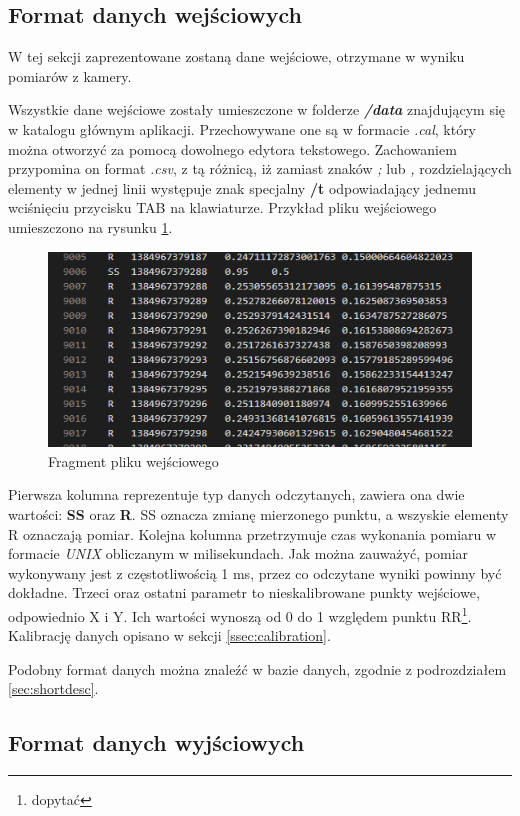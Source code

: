 \subsection{Format danych wejściowych}
W tej sekcji zaprezentowane zostaną dane wejściowe, otrzymane w wyniku pomiarów z kamery.\par
Wszystkie dane wejściowe zostały umieszczone w folderze \emph{\textbf{/data}} znajdującym się w katalogu głównym aplikacji. Przechowywane one są w formacie \emph{.cal}, który można otworzyć za pomocą dowolnego edytora tekstowego. Zachowaniem przypomina on format \emph{.csv}, z tą różnicą, iż zamiast znaków \emph{;} lub \emph{,} rozdzielających elementy w jednej linii występuje znak specjalny \textbf{/t} odpowiadający jednemu wciśnięciu przycisku TAB na klawiaturze. Przykład pliku wejściowego umieszczono na rysunku \ref{fig:plikwejsciowy}.
\begin{figure}[H]
        \centering
        \captionsetup{justification=centering,margin=2cm}
        \includegraphics[width=0.8\linewidth]{resources/plikwejsciowy.png}
        \caption{Fragment pliku wejściowego}
        \label{fig:plikwejsciowy}
\end{figure}
Pierwsza kolumna reprezentuje typ danych odczytanych, zawiera ona dwie wartości: \textbf{SS} oraz \textbf{R}. SS oznacza zmianę mierzonego punktu, a wszyskie elementy R oznaczają pomiar. Kolejna kolumna przetrzymuje czas wykonania pomiaru w formacie \emph{UNIX} obliczanym w milisekundach. Jak można zauważyć, pomiar wykonywany jest z częstotliwością 1 ms, przez co odczytane wyniki powinny być dokładne. Trzeci oraz ostatni parametr to nieskalibrowane punkty wejściowe, odpowiednio X i Y. Ich wartości wynoszą od 0 do 1 względem punktu RR\footnote{dopytać}. Kalibrację danych opisano w sekcji \ref{ssec:calibration}.\par
Podobny format danych można znaleźć w bazie danych, zgodnie z podrozdziałem \ref{sec:shortdesc}.
\subsection{Format danych wyjściowych}
\blindtext
